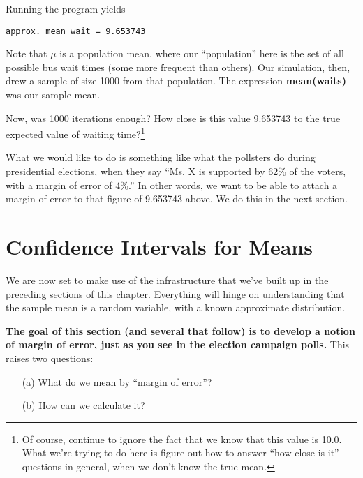 Running the program yields

\begin{Verbatim}[fontsize=\relsize{-2}]
approx. mean wait = 9.653743
\end{Verbatim}

Note that $\mu$ is a population mean, where our ``population'' here is
the set of all possible bus wait times (some more frequent than others).
Our simulation, then, drew a sample of size 1000 from that population.
The expression {\bf mean(waits)} was our sample mean.

Now, was 1000 iterations enough?  How close is this value 9.653743 to
the true expected value of waiting time?\footnote{Of course, continue to
ignore the fact that we know that this value is 10.0.  What we're trying
to do here is figure out how to answer ``how close is it'' questions 
in general, when we don't know the true mean.}

What we would like to do is something like what the pollsters do during
presidential elections, when they say ``Ms. X is supported by 62\% of
the voters, with a margin of error of 4\%.''  In other words, we want to
be able to attach a margin of error to that figure of 9.653743 above.
We do this in the next section.

\section{Confidence Intervals for Means}
\label{cim}

We are now set to make use of the infrastructure that we've built up in
the preceding sections of this chapter.  Everything will hinge on
understanding that the sample mean is a random variable, with a known
approximate distribution.

{\bf The goal of this section (and several that follow) is to develop a
notion of margin of error, just as you see in the election campaign
polls.}  This raises two questions:

\begin{itemize}

\item [(a)] What do we mean by ``margin of error''?

\item [(b)] How can we calculate it?

\end{itemize}

% 

